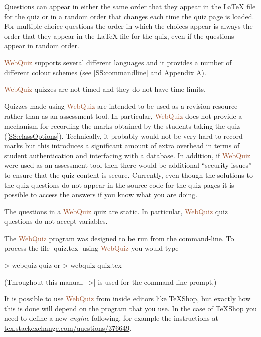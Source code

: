 \documentclass[svgnames]{article}
\newcommand\WebQuiz{\textcolor{Sienna}{WebQuiz}\xspace}
\begin{document}
      Questions can appear in either the same order that they appear in
      the \LaTeX{} file for the quiz or in a random order that changes
      each time the quiz page is loaded. For multiple choice questions the
      order in which the choices appear is always the order that they
      appear in the \LaTeX{} file for the quiz, even if the questions
      appear in random order.

      \WebQuiz supports several different languages and it
      provides a number of different colour schemes (see
      \autoref{SS:commandline} and \hyperref[SS:themes]{Appendix A}).

      \WebQuiz quizzes are not timed and they do not have time-limits.

      Quizzes made using \WebQuiz are intended to be used as a
      revision resource rather than as an assessment tool. In particular,
      \WebQuiz does not provide a mechanism for recording the marks
      obtained by the students taking the quiz
      (\autoref{SS:classOptions}). Technically, it probably would not be
      very hard to record marks but this introduces a significant amount
      of extra overhead in terms of student authentication and interfacing
      with a database. In addition, if \WebQuiz were used as an assessment
      tool then there would be additional ``security issues'' to ensure
      that the quiz content is secure. Currently, even though the
      solutions to the quiz questions do not appear in the \HTML source
      code for the quiz pages it is possible to access the answers if you
      know what you are doing.

      The questions in a \WebQuiz quiz are static. In particular,
      \WebQuiz quiz questions do not accept variables.

      The \WebQuiz program was designed to be run from the command-line.
      To process the file \BashCode|quiz.tex| using \WebQuiz you would
      type
      \begin{bashcode}
        > webquiz quiz         or         > webquiz quiz.tex
      \end{bashcode}
      (Throughout this manual, \BashCode|>| is used for the command-line
      prompt.)

      It is possible to use \WebQuiz from inside editors like
      \TeX Shop, but exactly how this is done will depend on the program
      that you use. In the case of \TeX Shop you need to define a
      new \textit{engine} following, for example the instructions at
      \href{https://tex.stackexchange.com/questions/376649}
           {tex.stackexchange.com/questions/376649}.
\end{document}

